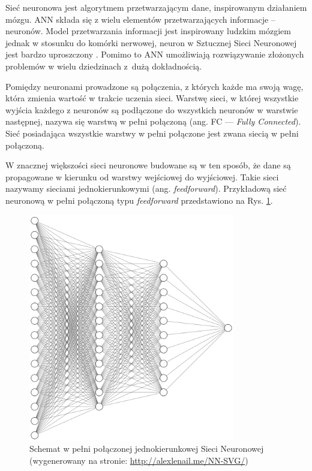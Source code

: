 Sieć neuronowa jest algorytmem przetwarzającym dane, inspirowanym działaniem mózgu. ANN składa się z wielu elementów przetwarzających informacje -- neuronów. Model przetwarzania informacji jest inspirowany ludzkim mózgiem jednak w stosunku do komórki nerwowej, neuron w Sztucznej Sieci Neuronowej jest bardzo uproszczony
\cite{tadeusiewicz1993sieci}. Pomimo to ANN umożliwiają rozwiązywanie złożonych
problemów w wielu dziedzinach z~dużą dokładnością.

Pomiędzy neuronami prowadzone są połączenia, z których każde ma swoją wagę, która 
zmienia wartość w trakcie uczenia sieci. Warstwę sieci, w której wszystkie wyjścia każdego z neuronów są podłączone do wszystkich neuronów w warstwie następnej, nazywa się warstwą w pełni połączoną (ang. FC — \emph{Fully Connected}).
Sieć posiadająca wszystkie warstwy w pełni połączone jest zwana siecią w pełni połączoną. 

W znacznej większości sieci neuronowe budowane są w ten sposób, że dane są propagowane w kierunku od warstwy wejściowej do wyjściowej. Takie sieci nazywamy sieciami jednokierunkowymi (ang. \emph{feedforward}). Przykładową sieć neuronową w pełni połączoną typu \emph{feedforward} przedstawiono na Rys. \ref{ann-img}.
\bigskip

\begin{figure}[h]
  \centering
  \includegraphics[width=0.8\textwidth]{img/ann.png}
  \caption{Schemat w pełni połączonej jednokierunkowej Sieci Neuronowej (wygenerowany na stronie: \url{http://alexlenail.me/NN-SVG/})}
  \label{ann-img}
\end{figure}



